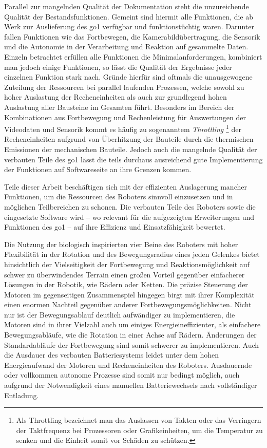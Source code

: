 Parallel zur mangelnden Qualität der Dokumentation steht die unzureichende Qualität der Bestandsfunktionen.
Gemeint sind hiermit alle Funktionen, die ab Werk zur Auslieferung des \gls{go1} verfügbar und funktionstüchtig waren.
Darunter fallen Funktionen wie das Fortbewegen, die Kamerabildübertragung, die Sensorik und die Autonomie in der Verarbeitung
und Reaktion auf gesammelte Daten.
Einzeln betrachtet erfüllen alle Funktionen die Minimalanforderungen, kombiniert man jedoch einige Funktionen, so lässt
die Qualität der Ergebnisse jeder einzelnen Funktion stark nach.
Gründe hierfür sind oftmals die unausgewogene Zuteilung der Ressourcen bei parallel laufenden Prozessen, welche sowohl zu
hoher Auslastung der Recheneinheiten als auch zur grundlegend hohen Auslastung aller Bausteine im Gesamten führt.
Besonders im Bereich der Kombinationen aus Fortbewegung und Rechenleistung für Auswertungen der Videodaten und Sensorik
kommt es häufig zu sogenanntem \emph{Throttling}
\footnote{Als Throttling bezeichnet man das Auslassen von Takten oder das Verringern der Taktfrequenz bei Prozessoren
oder Grafikeinheiten, um die Temperatur zu senken und die Einheit somit vor Schäden zu schützen.}
der Recheneinheiten aufgrund von Überhitzung der Bauteile durch die thermischen
Emissionen der mechanischen Bauteile.
Jedoch auch die mangelnde Qualität der verbauten Teile des \gls{go1} lässt die teils durchaus ausreichend gute Implementierung der
Funktionen auf Softwareseite an ihre Grenzen kommen.

Teile dieser Arbeit beschäftigen sich mit der effizienten Auslagerung mancher Funktionen, um die Ressourcen des Roboters
sinnvoll einzusetzen und in möglichen Teilbereichen zu schonen.
Die verbauten Teile des Roboters sowie die eingesetzte Software wird -- wo relevant für die aufgezeigten Erweiterungen und
Funktionen des \gls{go1} -- auf ihre Effizienz und Einsatzfähigkeit bewertet.



Die Nutzung der biologisch inspirierten vier Beine des Roboters mit hoher Flexibilität in der Rotation und des Bewegungsradius
eines jeden Gelenkes bietet hinsichtlich der Vielseitigkeit der Fortbewegung und Reaktionsmöglichkeit auf schwer zu
überwindendes Terrain einen großen Vorteil gegenüber einfacherer Lösungen in der Robotik, wie Rädern oder Ketten.
Die präzise Steuerung der Motoren im gegenseitigen Zusammenspiel hingegen birgt mit ihrer Komplexität einen enormen Nachteil
gegenüber anderer Fortbewegungsmöglichkeiten.
Nicht nur ist der Bewegungsablauf deutlich aufwändiger zu implementieren, die Motoren sind in ihrer Vielzahl auch
um einiges Energieineffizienter, als einfachere Bewegungsabläufe, wie die Rotation in einer Achse auf Rädern.
Änderungen der Standardabläufe der Fortbewegung sind somit schwerer zu implementieren.
Auch die Ausdauer des verbauten Batteriesystems leidet unter dem hohen Energieaufwand der Motoren und Recheneinheiten des Roboters.
Ausdauernde oder vollkommen autonome Prozesse sind somit nur bedingt möglich, auch aufgrund der Notwendigkeit eines
manuellen Batteriewechsels nach vollständiger Entladung.

